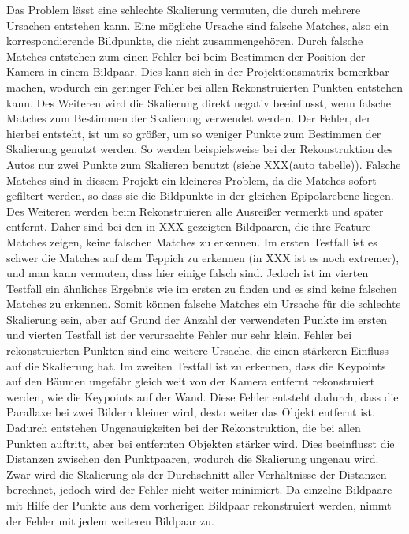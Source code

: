 Das Problem lässt eine schlechte Skalierung vermuten, die durch mehrere Ursachen entstehen kann. 
Eine mögliche Ursache sind falsche Matches, also ein korrespondierende Bildpunkte, die nicht zusammengehören.
Durch falsche Matches entstehen zum einen Fehler bei beim Bestimmen der Position der Kamera in einem Bildpaar.
Dies kann sich in der Projektionsmatrix bemerkbar machen, wodurch ein geringer Fehler bei allen Rekonstruierten Punkten entstehen kann.
Des Weiteren wird die Skalierung direkt negativ beeinflusst, wenn falsche Matches zum Bestimmen der Skalierung verwendet werden. 
Der Fehler, der hierbei entsteht, ist um so größer, um so weniger Punkte zum Bestimmen der Skalierung genutzt werden.
So werden beispielsweise bei der Rekonstruktion des Autos nur zwei Punkte zum Skalieren benutzt (siehe XXX(auto tabelle)).
Falsche Matches sind in diesem Projekt ein kleineres Problem, da die Matches sofort gefiltert werden, so dass sie die Bildpunkte in der gleichen Epipolarebene liegen.
Des Weiteren werden beim Rekonstruieren alle Ausreißer vermerkt und später entfernt.
Daher sind bei den in XXX gezeigten Bildpaaren, die ihre Feature Matches zeigen, keine falschen Matches zu erkennen.
Im ersten Testfall ist es schwer die Matches auf dem Teppich zu erkennen (in XXX ist es noch extremer), und man kann vermuten, dass hier einige falsch sind.
Jedoch ist im vierten Testfall ein ähnliches Ergebnis wie im ersten zu finden und es sind keine falschen Matches zu erkennen.
Somit können falsche Matches ein Ursache für die schlechte Skalierung sein, aber auf Grund der Anzahl der verwendeten Punkte im ersten und vierten Testfall ist der verursachte Fehler nur sehr klein.
Fehler bei rekonstruierten Punkten sind eine weitere Ursache, die einen stärkeren Einfluss auf die Skalierung hat. 
Im zweiten Testfall ist zu erkennen, dass die Keypoints auf den Bäumen ungefähr gleich weit von der Kamera entfernt rekonstruiert werden, wie die Keypoints auf der Wand.
Diese Fehler entsteht dadurch, dass die Parallaxe bei zwei Bildern kleiner wird, desto weiter das Objekt entfernt ist. %
Dadurch entstehen Ungenauigkeiten bei der Rekonstruktion, die bei allen Punkten auftritt, aber bei entfernten Objekten stärker wird. %
Dies beeinflusst die Distanzen zwischen den Punktpaaren, wodurch die Skalierung ungenau wird.
Zwar wird die Skalierung als der Durchschnitt aller Verhältnisse der Distanzen berechnet, jedoch wird der Fehler nicht weiter minimiert.
Da einzelne Bildpaare mit Hilfe der Punkte aus dem vorherigen Bildpaar rekonstruiert werden, nimmt der Fehler mit jedem weiteren Bildpaar zu. 

